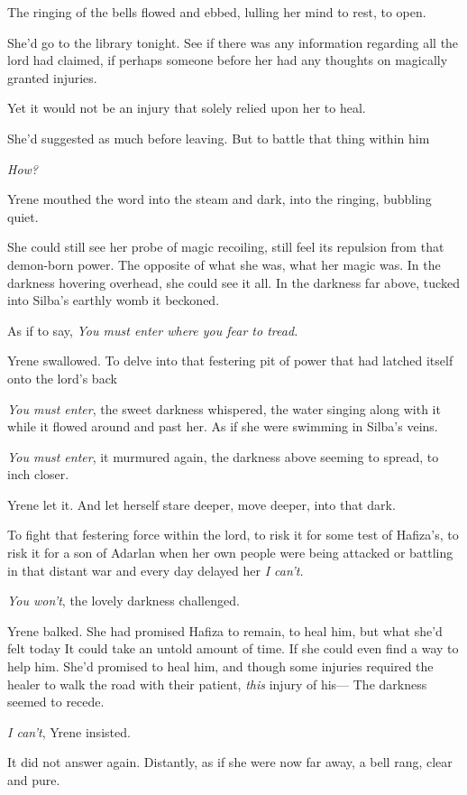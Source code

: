 The ringing of the bells flowed and ebbed, lulling her mind to rest, to open.

She'd go to the library tonight. See if there was any information regarding all the lord had claimed, if perhaps someone before her had any thoughts on magically granted injuries.

Yet it would not be an injury that solely relied upon her to heal.

She'd suggested as much before leaving. But to battle that thing within him

 \emph{How?}

Yrene mouthed the word into the steam and dark, into the ringing, bubbling quiet.

She could still see her probe of magic recoiling, still feel its repulsion from that demon-born power. The opposite of what she was, what her magic was. In the darkness hovering overhead, she could see it all. In the darkness far above, tucked into Silba's earthly womb  it beckoned.

As if to say, \emph{You must enter where you fear to tread.}

Yrene swallowed. To delve into that festering pit of power that had latched itself onto the lord's back 

\emph{You must enter}, the sweet darkness whispered, the water singing along with it while it flowed around and past her. As if she were swimming in Silba's veins.

\emph{You must enter}, it murmured again, the darkness above seeming to spread, to inch closer.

Yrene let it. And let herself stare deeper, move deeper, into that dark.

To fight that festering force within the lord, to risk it for some test of Hafiza's, to risk it for a son of Adarlan when her own people were being attacked or battling in that distant war and every day delayed her
 \emph{I can't.}

\emph{You won't}, the lovely darkness challenged.

Yrene balked. She had promised Hafiza to remain, to heal him, but what she'd felt today  It could take an untold amount of time. If she could even find a way to help him. She'd promised to heal him, and though some injuries required the healer to walk the road with their patient, \emph{this} injury of his--- The darkness seemed to recede.

\emph{I can't}, Yrene insisted.

It did not answer again. Distantly, as if she were now far away, a bell rang, clear and pure.

